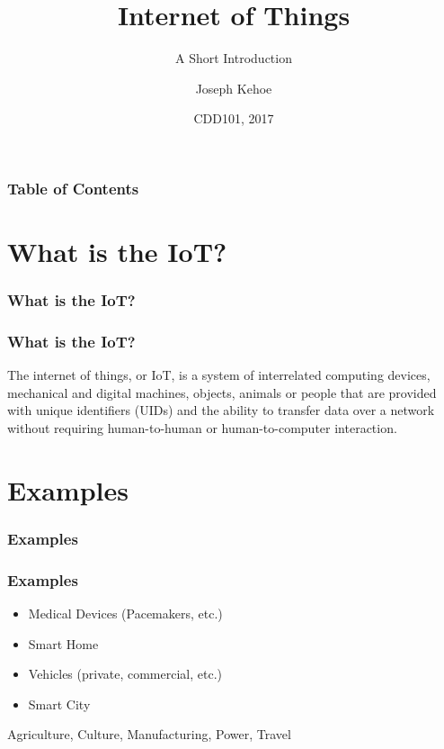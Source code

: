 \documentclass{beamer}
\title[IoT] %
{Internet of Things}
\subtitle{A Short Introduction}
\author[Dr. Joseph Kehoe] %
{Joseph Kehoe\inst{1}}
\institute[IT Carlow] %
{
	\inst{1}%
	Department of Computing and Networking\\
	Institute of Technology Carlow
}
\date[ITC 2017] %
{CDD101, 2017}
\begin{document}
 
\frame{\titlepage}
 
 
 
 \begin{frame}
 	\frametitle{Table of Contents}
 	\tableofcontents
 \end{frame}
 
 
 \section{What is the IoT?}
\begin{frame}
\frametitle{What is the IoT?}


\end{frame}

\begin{frame}
	\frametitle{What is the IoT?}
	The internet of things, or IoT, is a system of interrelated computing devices, mechanical and digital machines, objects, animals or people that are provided with unique identifiers (UIDs) and the ability to transfer data over a network without requiring human-to-human or human-to-computer interaction.
	
\end{frame}

 \section{Examples}
\begin{frame}
	\frametitle{Examples}

\end{frame}
\begin{frame}
	\frametitle{Examples}
	\begin{itemize}
		\item Medical Devices (Pacemakers, etc.)
		\item Smart Home
		\item Vehicles (private, commercial, etc.)
		\item Smart City
	\end{itemize}
	Agriculture, Culture, Manufacturing, Power, Travel
\end{frame}
\end{document}
